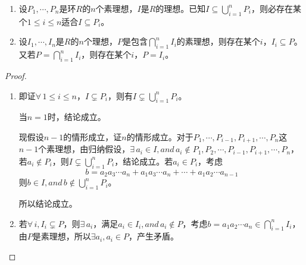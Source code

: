 \begin{proposition}
	\begin{enumerate}
		\item 设$P_{1},\cdots,P_{n}$是环$R$的$n$个素理想，$I$是$R$的理想。已知$I\subseteq\bigcup_{i=1}^{n}P_{i}$，则必存在某个$1\leq i\leq n$适合$I\subseteq P_{i}$。
		\item 设$I_{1},\cdots,I_{n}$是$R$的$n$个理想，$P$是包含$\bigcap_{i=1}^{n}I_{i}$的素理想，则存在某个$i$，$I_{i}\subseteq P$。又若$P=\bigcap_{i=1}^{n}I_{i}$，则存在某个$i$，$P=I_{i}$。
	\end{enumerate}
\end{proposition}

\begin{proof}
	\begin{enumerate}
		\item 即证$ \forall \, 1\leq i\leq n $，$I\subsetneq P_{i}$，则有$I\subsetneq\bigcup_{i=1}^{n}P_{i}$。
		\par
		当$n=1$时，结论成立。
		\par
		现假设$n-1$的情形成立，证$n$的情形成立。对于$P_{1},\cdots,P_{i-1},P_{i+1},\cdots,P_{n}$这$n-1$个素理想，由归纳假设，$\exists \, a_{i}\in I,and \, a_{i}\not\in P_{1},P_{2},\cdots,P_{i-1},P_{i+1},\cdots,P_{n}$，若$a_{i}\not\in P_{i}$，则$I\subsetneq \bigcup_{i=1}^{n}P_{i}$，结论成立。若$a_{i}\in P_{i}$，考虑
		\begin{equation*}
			b=a_{2}a_{3}\cdots a_{n}+a_{1}a_{3}\cdots a_{n}+\cdots +a_{1}a_{2}\cdots a_{n-1}
		\end{equation*}
		则$b\in I,and \, b\not\in \bigcup_{i=1}^{n}P_{i}$。
		\par
		所以结论成立。
		\item 若$\forall \, i,I_{i}\subsetneq P$，则$\exists \, a_{i}$，满足$a_{i}\in I_{i},and \, a_{i}\not\in P$，考虑$b=a_{1}a_{2}\cdots a_{n}\in \bigcap_{i=1}^{n}I_{i}$，由$P$是素理想，所以$\exists a_{i},a_{i}\in P$，产生矛盾。
	\end{enumerate}
\end{proof}
